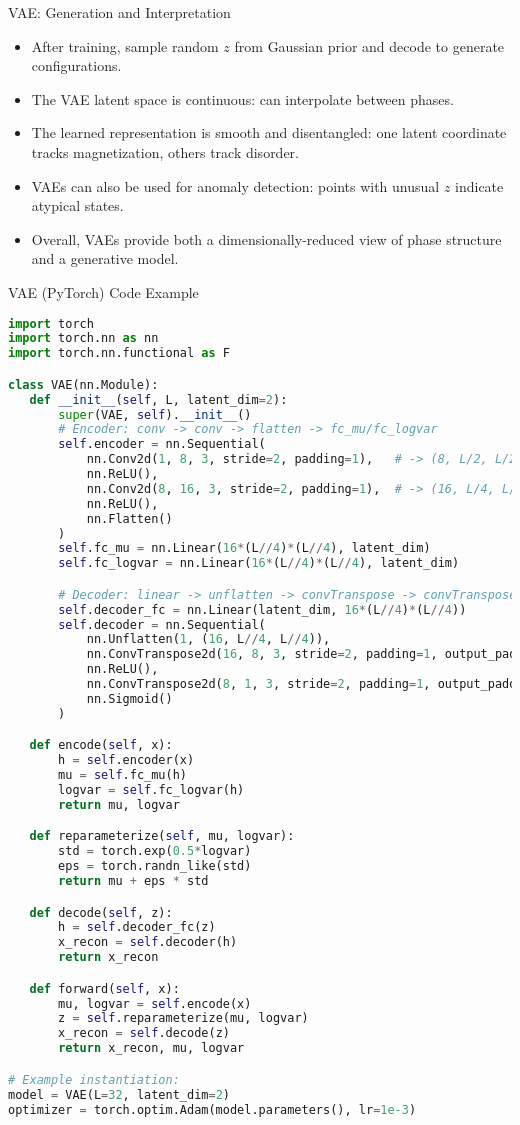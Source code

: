 \documentclass{beamer}
\begin{document}
\begin{frame}{VAE: Generation and Interpretation}
 \begin{itemize}
   \item After training, sample random $z$ from Gaussian prior and decode to generate configurations.
   \item The VAE latent space is continuous: can interpolate between phases.
   \item The learned representation is smooth and disentangled: one latent coordinate tracks magnetization, others track disorder.
   \item VAEs can also be used for anomaly detection: points with unusual $z$ indicate atypical states.
   \item Overall, VAEs provide both a dimensionally-reduced view of phase structure and a generative model.
 \end{itemize}
\end{frame}

\begin{frame}[fragile]{VAE (PyTorch) Code Example}
 \begin{lstlisting}[language=Python]
import torch
import torch.nn as nn
import torch.nn.functional as F

class VAE(nn.Module):
   def __init__(self, L, latent_dim=2):
       super(VAE, self).__init__()
       # Encoder: conv -> conv -> flatten -> fc_mu/fc_logvar
       self.encoder = nn.Sequential(
           nn.Conv2d(1, 8, 3, stride=2, padding=1),   # -> (8, L/2, L/2)
           nn.ReLU(),
           nn.Conv2d(8, 16, 3, stride=2, padding=1),  # -> (16, L/4, L/4)
           nn.ReLU(),
           nn.Flatten()
       )
       self.fc_mu = nn.Linear(16*(L//4)*(L//4), latent_dim)
       self.fc_logvar = nn.Linear(16*(L//4)*(L//4), latent_dim)

       # Decoder: linear -> unflatten -> convTranspose -> convTranspose
       self.decoder_fc = nn.Linear(latent_dim, 16*(L//4)*(L//4))
       self.decoder = nn.Sequential(
           nn.Unflatten(1, (16, L//4, L//4)),
           nn.ConvTranspose2d(16, 8, 3, stride=2, padding=1, output_padding=1),  # -> (8, L/2, L/2)
           nn.ReLU(),
           nn.ConvTranspose2d(8, 1, 3, stride=2, padding=1, output_padding=1),   # -> (1, L, L)
           nn.Sigmoid()
       )

   def encode(self, x):
       h = self.encoder(x)
       mu = self.fc_mu(h)
       logvar = self.fc_logvar(h)
       return mu, logvar

   def reparameterize(self, mu, logvar):
       std = torch.exp(0.5*logvar)
       eps = torch.randn_like(std)
       return mu + eps * std

   def decode(self, z):
       h = self.decoder_fc(z)
       x_recon = self.decoder(h)
       return x_recon

   def forward(self, x):
       mu, logvar = self.encode(x)
       z = self.reparameterize(mu, logvar)
       x_recon = self.decode(z)
       return x_recon, mu, logvar

# Example instantiation:
model = VAE(L=32, latent_dim=2)
optimizer = torch.optim.Adam(model.parameters(), lr=1e-3)
 \end{lstlisting}
\end{frame}
\end{document}
